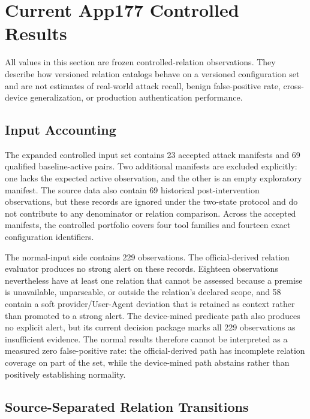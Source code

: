 \section{Current App177 Controlled Results}
\label{sec:current-results}



All values in this section are frozen controlled-relation observations. They describe how versioned relation catalogs behave on a versioned configuration set and are not estimates of real-world attack recall, benign false-positive rate, cross-device generalization, or production authentication performance.

\subsection{Input Accounting}

The expanded controlled input set contains 23 accepted attack manifests and 69 qualified baseline-active pairs. Two additional manifests are excluded explicitly: one lacks the expected active observation, and the other is an empty exploratory manifest. The source data also contain 69 historical post-intervention observations, but these records are ignored under the two-state protocol and do not contribute to any denominator or relation comparison. Across the accepted manifests, the controlled portfolio covers four tool families and fourteen exact configuration identifiers.

The normal-input side contains 229 \appfp observations. The official-derived relation evaluator produces no strong alert on these records. Eighteen observations nevertheless have at least one relation that cannot be assessed because a premise is unavailable, unparseable, or outside the relation's declared scope, and 58 contain a soft provider/User-Agent deviation that is retained as context rather than promoted to a strong alert. The device-mined predicate path also produces no explicit alert, but its current decision package marks all 229 observations as insufficient evidence. The normal results therefore cannot be interpreted as a measured zero false-positive rate: the official-derived path has incomplete relation coverage on part of the set, while the device-mined path abstains rather than positively establishing normality.

\subsection{Source-Separated Relation Transitions}

